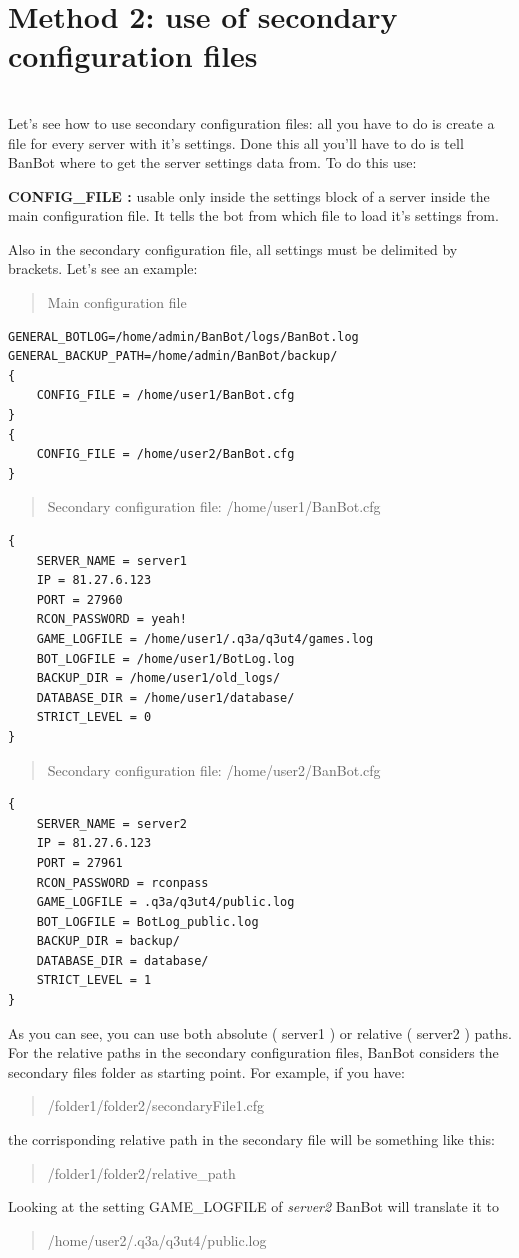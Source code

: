 \documentclass[a4paper]{article}
\begin{document}
\chapter{\textbf{Method 2: use of secondary configuration files}}\\
Let's see how to use secondary configuration files: all you have to do is create a file for every server with it's settings. Done this all you'll have to do is
tell BanBot where to get the server settings data from.
To do this use:
\begin{description}
\item{\textbf{CONFIG\_FILE :}} usable only inside the settings block of a server inside the main configuration file. It tells the bot from which file to load
it's settings from.
\end{description}
Also in the secondary configuration file, all settings must be delimited by brackets.
Let's see an example:
\begin{quote}
Main configuration file
\end{quote}
\begin{lstlisting}
GENERAL_BOTLOG=/home/admin/BanBot/logs/BanBot.log
GENERAL_BACKUP_PATH=/home/admin/BanBot/backup/
{
	CONFIG_FILE = /home/user1/BanBot.cfg
}
{
	CONFIG_FILE = /home/user2/BanBot.cfg
}
\end{lstlisting}
\begin{quote}
Secondary configuration file: /home/user1/BanBot.cfg
\end{quote}
\begin{lstlisting}
{
	SERVER_NAME = server1
	IP = 81.27.6.123
	PORT = 27960
	RCON_PASSWORD = yeah!
	GAME_LOGFILE = /home/user1/.q3a/q3ut4/games.log
	BOT_LOGFILE = /home/user1/BotLog.log
	BACKUP_DIR = /home/user1/old_logs/
	DATABASE_DIR = /home/user1/database/
	STRICT_LEVEL = 0
}
\end{lstlisting}
\begin{quote}
Secondary configuration file: /home/user2/BanBot.cfg
\end{quote}
\begin{lstlisting}
{
	SERVER_NAME = server2
	IP = 81.27.6.123
	PORT = 27961
	RCON_PASSWORD = rconpass
	GAME_LOGFILE = .q3a/q3ut4/public.log
	BOT_LOGFILE = BotLog_public.log
	BACKUP_DIR = backup/
	DATABASE_DIR = database/
	STRICT_LEVEL = 1
}
\end{lstlisting}
As you can see, you can use both absolute ( server1 ) or relative ( server2 ) paths.
For the relative paths in the secondary configuration files, BanBot considers the secondary files folder as starting point.
For example, if you have:
\begin{quote}
/folder1/folder2/secondaryFile1.cfg
\end{quote}
the corrisponding relative path in the secondary file will be something like this:
\begin{quote}
/folder1/folder2/relative\_path
\end{quote}
Looking at the setting GAME\_LOGFILE of \textit{server2} BanBot will translate it to
\begin{quote}
/home/user2/.q3a/q3ut4/public.log
\end{quote}
\end{document}
